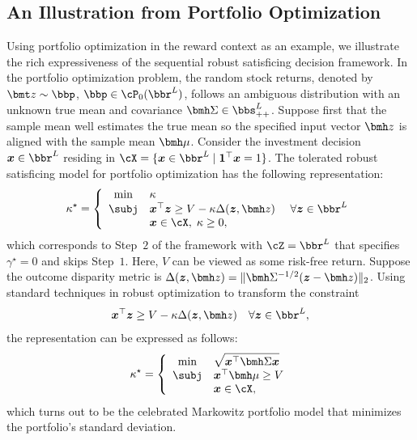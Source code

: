 \documentclass[opre, blindrev]{informs4}
\newcommand{\1}[1]{\mathds{1}{\left(#1\right)}}
\begin{document}
\subsection*{An Illustration from Portfolio Optimization}

Using portfolio optimization in the reward context as an example, we illustrate the rich expressiveness of the sequential robust satisficing decision framework. In the portfolio optimization problem, the random stock returns, denoted by $\bmt z \sim \bbp$, $\bbp \in \cP_0(\bbr^L)$, follows an ambiguous distribution with an unknown true mean and covariance $\bmh \Sigma \in \bbs^L_{++}$. Suppose first that the sample mean well estimates the true mean so the specified input vector $\bmh z$ is aligned with the sample mean $\bmh \mu$. Consider the investment decision $\bm x \in \bbr^L$ residing in $\cX = \{\bm x \in \bbr^L \;|\; \bm 1 ^\top \bm x = 1\}$. The tolerated robust satisficing model for portfolio optimization has the following representation:
$$
\kappa^\star = \left\{
\begin{array}{cll}
\min & \kappa \\
\subj& \bm x^\top \bm z  \geq V - \kappa \Delta(\bm z,\bmh z) &~\forall \bm z \in \bbr^L \\
& \bm x \in \cX, \; \kappa \geq 0,
\end{array}
\right.
$$
which corresponds to Step~$2$ of the framework with $\cZ = \bbr^L$ that specifies $\gamma^\star = 0$ and skips Step~$1$. Here, $V$ can be viewed as some risk-free return. Suppose the outcome disparity metric is $\Delta(\bm z, \bmh z) = \|\bmh \Sigma^{-1/2}(\bm z - \bmh z)\|_2$. Using standard techniques in robust optimization to transform the constraint
\[
\bm x^\top \bm z  \geq V - \kappa \Delta(\bm z,\bmh z) ~~~\forall \bm z \in \bbr^L,
\]
the representation can be expressed as follows:
\begin{equation}
\label{mod:MinStdProblem}    
\kappa^\star = \left\{ 
\begin{array}{cll}
\min & \displaystyle \sqrt{\bm x^\top \bmh \Sigma \bm x} \\
\subj& \bm x^\top \bmh \mu \geq V \\
& \bm x \in \cX,
\end{array}
\right.
\end{equation}
which turns out to be the celebrated Markowitz portfolio model that minimizes the portfolio's standard deviation.
\end{document}
